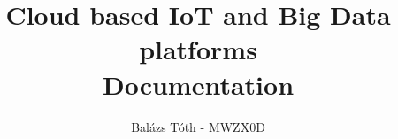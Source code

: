 \documentclass{article}
\date{}
\begin{document}
\title{Cloud based IoT and Big Data platforms\\ \small Documentation}
\author{Balázs Tóth - MWZX0D}
\maketitle

\tableofcontents
\clearpage










\end{document}

